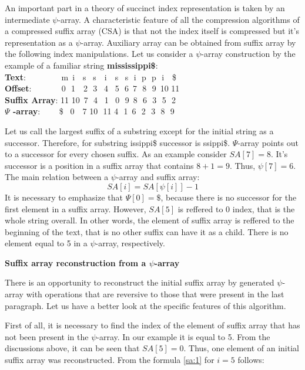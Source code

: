 An important part in a theory of succinct index representation is taken by an intermediate $\psi$-array.
A characteristic feature of all the compression algorithms of a compressed suffix array (CSA) is 
that not the index itself is compressed but it's representation as a $\psi$-array.
Auxiliary array can be obtained from suffix array by the following index manipulations.
Let us consider a $\psi$-array construction by the example of a familiar string \textbf{mississippi\$}:
\\ \textbf{Text}:\,\,\,\,\,\,\,\,\,\,\,\,\,\,\,\,\,\,\,\,\,\,\,\,
m \,i \,\,\,\,s \,\,\,s \,\,\,\,i \,\,\,\,s \,\,\,s \,\,i \,\,p \,\,p \,\,i \,\,\,\,\$
\\ \textbf{Offset}:\,\,\,\,\,\,\,\,\,\,\,\,\,\,\,\,\,\,\,\, 0 \,\,1
\,\,\,\,2 \,\,3 \,\,\,4 \,\,\,5 \,\,6 \,7 \,\,8 \,\,9 \,10 11
\\ \textbf{Suffix Array}:   11 10 \,7 \,\,4 \,\,\,1 \,\,\,0 \,\,9 \,8 \,\,6 \,\,3 \,\,5 \,\,2
\\ \textbf{$\Psi$ -array}: \,\,\,\,\,\,\,\,\,\,\,\,\$ \,\,\,0 \,\,\,\,7
10 \,\,11 4 \,\,1 \,6 \,\,2 \,\,3 \,\,8 \,\,9

Let us call the largest suffix of a substring except for the initial string as a successor.
Therefore, for substring issippi\$ successor is ssippi\$.
$\Psi$-array points out to a successor for every chosen suffix.
As an example consider $SA[7] = 8$. It's successor is a position in a suffix array that contains $8 + 1 = 9$.
Thus, $\psi[7] = 6$. The main relation between a $\psi$-array and suffix array:
\begin{equation}\label{sa:1}
SA[i] = SA[\psi[i]] - 1
\end{equation}
It is necessary to emphasize that $\Psi[0] = \$$, because there is no successor
for the first element in a suffix array.
However, $SA[5]$ is reffered to 0 index, that is the whole string overall.
In other words, the element of suffix array is reffered to the beginning of the text,
that is no other suffix can have it as a child.
There is no element equal to 5 in a $\psi$-array, respectively.

\textbf{Suffix array reconstruction from a $\psi$-array}

There is an opportunity to reconstruct the initial suffix array by generated $\psi$-array
with operations that are reversive to those that were present in the last paragraph.
Let us have a better look at the specific features of this algorithm.

First of all, it is necessary to find the index of the element of suffix array
that has not been present in the $\psi$-array.
In our example it is equal to 5. From the discussions above, it can be seen that $SA[5] = 0$.
Thus, one element of an initial suffix array was reconstructed. From the formula \ref{sa:1} for $i = 5$ follows:

